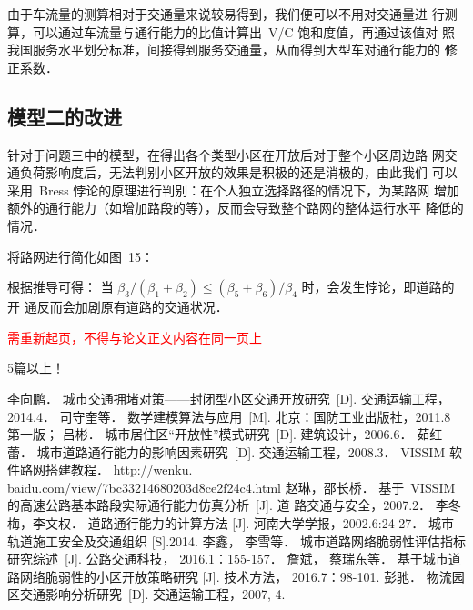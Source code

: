 \documentclass[12pt,a4paper]{mcmthesis}
\begin{document}
由于车流量的测算相对于交通量来说较易得到，我们便可以不用对交通量进
行测算，可以通过车流量与通行能力的比值计算出~V/C 饱和度值，再通过该值对
照我国服务水平划分标准，间接得到服务交通量，从而得到大型车对通行能力的
修正系数．


\subsection{模型二的改进}

针对于问题三中的模型，在得出各个类型小区在开放后对于整个小区周边路
网交通负荷影响度后，无法判别小区开放的效果是积极的还是消极的，由此我们
可以采用~Bress 悖论的原理进行判别：在个人独立选择路径的情况下，为某路网
增加额外的通行能力（如增加路段的等），反而会导致整个路网的整体运行水平
降低的情况．

将路网进行简化如图~15：

根据推导可得： 当 $\beta_{3}/\left(\beta_{1}+\beta_{2}\right) \leq\left(\beta_{5}+\beta_{6}\right)/\beta_{4}$ 时，会发生悖论，即道路的开
通反而会加剧原有道路的交通状况．

\textcolor{red}{需重新起页，不得与论文正文内容在同一页上}

\begin{rmk}
5篇以上！
\end{rmk}

\newpage

\begin{thebibliography}{99}
 李向鹏． 城市交通拥堵对策——封闭型小区交通开放研究~[D]. 交通运输工程，
2014.4．
 司守奎等． 数学建模算法与应用~[M]. 北京：国防工业出版社，2011.8 第一版；
 吕彬． 城市居住区“开放性”模式研究~[D]. 建筑设计，2006.6．
 茹红蕾． 城市道路通行能力的影响因素研究~[D]. 交通运输工程，2008.3．
 VISSIM 软件路网搭建教程．
http://wenku. baidu.com/view/7bc33214680203d8ce2f24c4.html
 赵琳，邵长桥． 基于~VISSIM 的高速公路基本路段实际通行能力仿真分析~[J]. 道
路交通与安全，2007.2．
 李冬梅，李文权． 道路通行能力的计算方法 [J]. 河南大学学报，2002.6:24-27．
 城市轨道施工安全及交通组织 [S].2014.
 李鑫， 李雪等． 城市道路网络脆弱性评估指标研究综述~[J]. 公路交通科技，
2016.1：155-157．
 詹斌， 蔡瑞东等． 基于城市道路网络脆弱性的小区开放策略研究 [J]. 技术方法，
2016.7：98-101.
 彭驰． 物流园区交通影响分析研究~[D]. 交通运输工程，2007, 4.

\end{thebibliography}
\newpage
\end{document}
